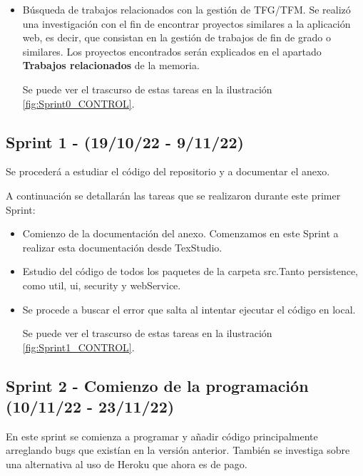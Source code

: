\begin{itemize}
	\item Búsqueda de trabajos relacionados con la gestión de TFG/TFM.
	Se realizó una investigación con el fin de encontrar proyectos similares a la aplicación web, es decir, que consistan en la gestión de trabajos de fin de grado o similares. Los proyectos encontrados serán explicados en el apartado \textbf{Trabajos relacionados} de la memoria.
	
	Se puede ver el trascurso de estas tareas en la ilustración \ref{fig:Sprint0_CONTROL}.
	
\end{itemize}

\subsection{Sprint 1 - (19/10/22 - 9/11/22)}

Se procederá a estudiar el código del repositorio y a documentar el anexo.

A continuación se detallarán las tareas que se realizaron durante este primer Sprint:

\begin{itemize}
	
	\item Comienzo de la documentación del anexo. Comenzamos en este Sprint a realizar esta documentación desde TexStudio.
	
	\item Estudio del código de todos los paquetes de la carpeta src.Tanto persistence, como util, ui, security y webService.
	
	\item Se procede a buscar el error que salta al intentar ejecutar el código en local.
	
	Se puede ver el trascurso de estas tareas en la ilustración \ref{fig:Sprint1_CONTROL}.
	
\end{itemize}

\subsection{Sprint 2 - Comienzo de la programación (10/11/22 - 23/11/22)}

En este sprint se comienza a programar y añadir código principalmente arreglando bugs que existían en la versión anterior. También se investiga sobre una alternativa al uso de Heroku que ahora es de pago.

